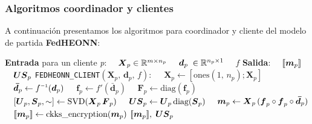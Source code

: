 \documentclass[00-Trabajo_Final.tex]{subfiles}
\begin{document}
\subsubsection{Algoritmos coordinador y clientes}
A continuación presentamos los algoritmos para coordinador y cliente del modelo de partida \textbf{FedHEONN}:

\begin{algorithm}[H]
\caption{Pseudocódigo para cliente FedHEONN}
\label{alg:fedclient}
\begin{algorithmic}[1]
\STATE \textbf{Entrada} para un cliente \textit{p}: 
    \STATE $\quad \boldsymbol{X}_p \in \mathbb{R}^{m \times n_p}$ \hfill {}
    \STATE $\quad \boldsymbol{d}_p\; \in \mathbb{R}^{n_p \times 1}$ \hfill {}
    \STATE $\quad f$ \hfill {}
\STATE \textbf{Salida}:
    \STATE $\quad [\![\boldsymbol{m}_p]\!]$ \hfill {}
    \STATE $\quad \boldsymbol{US}_p$ \hfill {}
\REQUIRE \verb|FEDHEONN_CLIENT|$(\boldsymbol{X}_p,\, \boldsymbol{d}_p,\, f):$
    \STATE $\quad \boldsymbol{X}_p \gets [\text{ones}(1,\, n_p); \boldsymbol{X}_p]$ \hfill {}
    \STATE $\quad \boldsymbol{\bar{d}}_p \gets f\inv(\boldsymbol{d}_p)$ \hfill {}
    \STATE $\quad \boldsymbol{f}_p \gets f'(\boldsymbol{\bar{d}}_p)$ \hfill {}
    \STATE $\quad \boldsymbol{F}_p \gets \text{diag}(\boldsymbol{f}_p)$ \hfill {}
    \STATE $\quad [\boldsymbol{U}_p, \boldsymbol{S}_p, \sim] \gets \text{SVD}(\boldsymbol{X}_p\,\boldsymbol{F}_p)$ \hfill {}
    \STATE $\quad \boldsymbol{US}_p \gets \boldsymbol{U}_p\,\text{diag}(\boldsymbol{S}_p)$ \hfill {}
    \STATE $\quad \boldsymbol{m}_p \gets \boldsymbol{X}_p \, (\boldsymbol{f}_p \circ \boldsymbol{f}_p \circ \boldsymbol{\bar{d}}_p)$ \hfill {}
    \STATE $\quad [\![\boldsymbol{m}_p]\!] \gets \text{ckks\_encryption}(\boldsymbol{m}_p)$ \hfill {}
    \RETURN $[\![\boldsymbol{m}_p]\!],\;\boldsymbol{US}_p$
\ENSURE
\end{algorithmic}
\end{algorithm}
\end{document}
